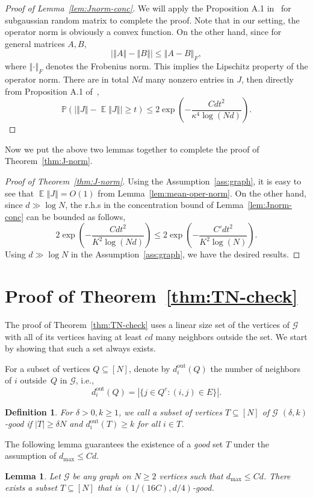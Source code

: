 \documentclass[letterpaper,11pt,reqno]{amsart}
\newtheorem{lem}[thm]{Lemma}
\newtheorem{defn}[thm]{Definition}
\renewcommand{\le}{\leqslant}
\renewcommand{\ge}{\geqslant}
\newcommand{\norm}[1]{\left\Vert#1\right\Vert}
\newcommand{\abs}[1]{\left\vert#1\right\vert}
\newcommand{\cG}{\mathcal{G}}\newcommand{\cH}{\mathcal{H}}\newcommand{\cI}{\mathcal{I}}
\newcommand{\bP}{\mathbb{P}}\newcommand{\bQ}{\mathbb{Q}}\newcommand{\bR}{\mathbb{R}}
\DeclareMathOperator{\E}{\mathds{E}}
\newcommand{\dout}{d^{\mathrm{out}}}
\begin{document}
\begin{proof}[Proof of Lemma~\ref{lem:Jnorm-conc}]
    We will apply the Proposition A.1 in~\cite{CDG23} for subgaussian random matrix to complete the proof. Note that in our setting, the operator norm is obviously a convex function. On the other hand, since for general matrices $A,B$,
    \[
    \abs{\norm{A} - \norm{B}} \le \norm{A-B}_F,
    \]
    where $\norm{\cdot}_F$ denotes the Frobenius norm. This implies the Lipschitz property of the operator norm. There are in total $Nd$ many nonzero entries in $J$, then directly from Proposition A.1 of~\cite{CDG23},
    \[
    \bP(\abs{\norm{J} - \E \norm{J}}\ge t) \le 2\exp\left(-\frac{Cdt^2}{\kappa^4 \log(Nd)}\right).
    \]
\end{proof}
Now we put the above two lemmas together to complete the proof of Theorem~\ref{thm:J-norm}.
\begin{proof}[Proof of Theorem~\ref{thm:J-norm}]
    Using the Assumption~\ref{ass:graph}, it is easy to see that $\E \norm{J} = O(1)$ from Lemma~\ref{lem:mean-oper-norm}. On the other hand, since $d \gg \log N$, the r.h.s in the concentration bound of Lemma~\ref{lem:Jnorm-conc} can be bounded as follows, 
    \[
    2\exp\left(-\frac{Cdt^2}{K^2 \log(Nd)}\right) \le 2\exp\left(-\frac{C'dt^2}{K^2 \log(N)}\right).
    \]
    Using $d\gg \log N$ in the Assumption~\ref{ass:graph}, we have the desired results. 
\end{proof}












\section{Proof of Theorem~\ref{thm:TN-check}}\label{sec:pf-thm-TN}


The proof of Theorem~\ref{thm:TN-check} uses a linear size set of the vertices of $\cG$ with all of its vertices having at least $c d$ many neighbors outside the set. We start by showing that such a set always exists.



For a subset of vertices $Q \subseteq [N]$, denote by $\dout_i(Q)$  the number of neighbors of $i$ outside~$Q$ in $\cG$, i.e., 
\[ \dout_i(Q) = | \{ j \in Q^c: (i, j) \in E  \}|.\]
\begin{defn}
   For $\delta> 0, k \ge 1$,  we call a subset of vertices $T \subseteq [N]$ of $\cG$ $(\delta, k)$-good if 
    $|T| \ge \delta N$ and $\dout_i(T) \ge k$ for all $i\in T$.
\end{defn}  
The following lemma guarantees the existence of a \emph{good} set $T$ under the assumption of $d_{\max} \le Cd$.
\begin{lem}\label{lem:T-set}
Let $\cG$ be any graph on $N \ge 2$ vertices such that  $d_{\max} \le Cd$. There exists a subset $T \subseteq [N]$ that is $(1/(16C), d/4)$-good.
\end{lem}
\end{document}
